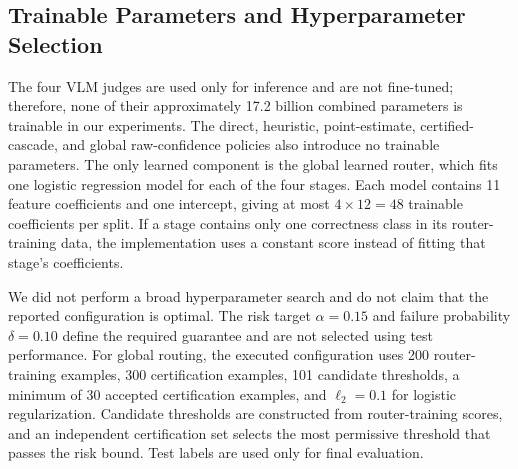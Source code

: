 \documentclass[11pt]{article}
\newcommand{\todo}[1]{\textcolor{red}{\textbf{[TEAM TO COMPLETE: #1]}}}
\begin{document}
\subsection{Trainable Parameters and Hyperparameter Selection}

The four VLM judges are used only for inference and are not fine-tuned;
therefore, none of their approximately 17.2 billion combined parameters is
trainable in our experiments. The direct, heuristic, point-estimate,
certified-cascade, and global raw-confidence policies also introduce no
trainable parameters. The only learned component is the global learned
router, which fits one logistic regression model for each of the four stages.
Each model contains 11 feature coefficients and one intercept, giving at most
$4\times12=48$ trainable coefficients per split. If a stage contains only one
correctness class in its router-training data, the implementation uses a
constant score instead of fitting that stage's coefficients.

We did not perform a broad hyperparameter search and do not claim that the
reported configuration is optimal. The risk target $\alpha=0.15$ and failure
probability $\delta=0.10$ define the required guarantee and are not selected
using test performance. For global routing, the executed configuration uses
200 router-training examples, 300 certification examples, 101 candidate
thresholds, a minimum of 30 accepted certification examples, and
$\ell_2=0.1$ for logistic regularization. Candidate thresholds are constructed
from router-training scores, and an independent certification set selects the
most permissive threshold that passes the risk bound. Test labels are used
only for final evaluation.

\end{document}
